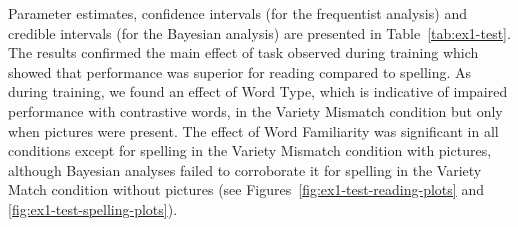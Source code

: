 \documentclass[doc,floatsintext]{apa6}
\begin{document}
Parameter estimates, confidence intervals (for the frequentist analysis)
and credible intervals (for the Bayesian analysis) are presented in
Table~\ref{tab:ex1-test}. The results confirmed the main effect of task
observed during training which showed that performance was superior for
reading compared to spelling. As during training, we found an effect of
Word Type, which is indicative of impaired performance with contrastive
words, in the Variety Mismatch condition but only when pictures were
present. The effect of Word Familiarity was significant in all
conditions except for spelling in the Variety Mismatch condition with
pictures, although Bayesian analyses failed to corroborate it for
spelling in the Variety Match condition without pictures (see
Figures~\ref{fig:ex1-test-reading-plots} and
\ref{fig:ex1-test-spelling-plots}).

\newpage
\end{document}
